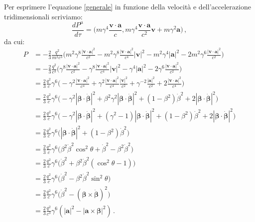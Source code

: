 \documentclass[twoside]{article}
\begin{document}
Per esprimere l'equazione \ref{generale} in funzione della velocità e dell'accelerazione tridimensionali scriviamo:
\begin{equation*}
\frac{dP^\mu}{d\tau}=\biggl( m\gamma^4 \frac{\mathbf{v}\cdot\mathbf{a}}{c}, m\gamma^4 \frac{\mathbf{v}\cdot\mathbf{a}}{c^2} \mathbf{v}+m \gamma^2 \mathbf{a}\biggr) \, ,
\end{equation*}
da cui:
\begin{align*}
P&=-\frac{2}{3} \frac{q^2}{m^2 c^3} \biggl( m^2 \gamma^8 \frac{|\mathbf{v}\cdot\mathbf{a}|^2}{c^2}-m^2\gamma^8 \frac{|\mathbf{v}\cdot\mathbf{a}|^2}{c^4}|\mathbf{v}|^2-m^2\gamma^4|\mathbf{a}|^2-2m^2\gamma^6 \frac{|\mathbf{v}\cdot\mathbf{a}|^2}{c^2} \biggr) \\
&=-\frac{2}{3} \frac{q^2}{c^3} \biggl(\gamma^8 \frac{|\mathbf{v}\cdot\mathbf{a}|^2}{c^2}-\gamma^8 \frac{|\mathbf{v}\cdot\mathbf{a}|^2}{c^4}|\mathbf{v}|^2-\gamma^4|\mathbf{a}|^2-2\gamma^6 \frac{|\mathbf{v}\cdot\mathbf{a}|^2}{c^2} \biggr) \\
&=\frac{2}{3} \frac{q^2}{c} \gamma^6 \biggl(-\gamma^2 \frac{|\mathbf{v}\cdot\mathbf{a}|^2}{c^4}+\gamma^2 \frac{|\mathbf{v}\cdot\mathbf{a}|^2}{c^4} \frac{|\mathbf{v}|^2}{c^2}+\gamma^{-2} \frac{|\mathbf{a}|^2}{c^2}+2\frac{|\mathbf{v}\cdot\mathbf{a}|^2}{c^4} \biggr) \\
&=\frac{2}{3} \frac{q^2}{c} \gamma^6 \biggl(-\gamma^2 |\bm{\beta}\cdot\bm{\dot{\beta}}|^2+\beta^2\gamma^2|\bm{\beta}\cdot\bm{\dot{\beta}}|^2+(1-\beta^2)\dot{\beta}^2+2|\bm{\beta}\cdot\bm{\dot{\beta}}|^2 \biggr) \\
&=\frac{2}{3} \frac{q^2}{c} \gamma^6 \biggl(-\gamma^2 |\bm{\beta}\cdot\bm{\dot{\beta}}|^2+(\gamma^2-1)|\bm{\beta}\cdot\bm{\dot{\beta}}|^2+(1-\beta^2)\dot{\beta}^2+2|\bm{\beta}\cdot\bm{\dot{\beta}}|^2 \biggr) \\
&=\frac{2}{3} \frac{q^2}{c} \gamma^6 \biggl( |\bm{\beta}\cdot\bm{\dot{\beta}}|^2+(1-\beta^2)\dot{\beta}^2 \biggr) \\
&=\frac{2}{3} \frac{q^2}{c} \gamma^6 \biggl( \beta^2\dot{\beta}^2\cos^2\theta+\dot{\beta}^2-\beta^2\dot{\beta}^2 \biggr) \\
&=\frac{2}{3} \frac{q^2}{c} \gamma^6 \biggl( \dot{\beta}^2+\beta^2\dot{\beta}^2(\cos^2\theta-1) \biggr) \\
&=\frac{2}{3} \frac{q^2}{c} \gamma^6 \biggl( \dot{\beta}^2-\beta^2\dot{\beta}^2\sin^2\theta \biggr) \\
&=\frac{2}{3} \frac{q^2}{c} \gamma^6 \biggl( \dot{\beta}^2-(\bm{\beta}\times\bm{\dot{\beta}})^2 \biggr) \\
&=\frac{2}{3}\frac{q^2}{c^3} \gamma^6 (|\mathbf{a}|^2-|\mathbf{a}\times\bm{\beta}|^2) \, .
\end{align*}
\end{document}
